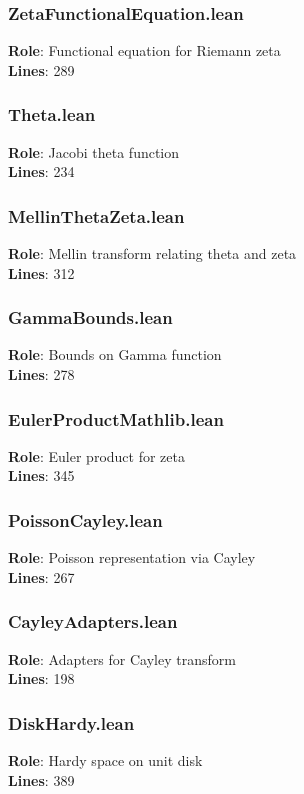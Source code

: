 \subsubsection{ZetaFunctionalEquation.lean}
\textbf{Role}: Functional equation for Riemann zeta\\
\textbf{Lines}: 289

\subsubsection{Theta.lean}
\textbf{Role}: Jacobi theta function\\
\textbf{Lines}: 234

\subsubsection{MellinThetaZeta.lean}
\textbf{Role}: Mellin transform relating theta and zeta\\
\textbf{Lines}: 312

\subsubsection{GammaBounds.lean}
\textbf{Role}: Bounds on Gamma function\\
\textbf{Lines}: 278

\subsubsection{EulerProductMathlib.lean}
\textbf{Role}: Euler product for zeta\\
\textbf{Lines}: 345

\subsubsection{PoissonCayley.lean}
\textbf{Role}: Poisson representation via Cayley\\
\textbf{Lines}: 267

\subsubsection{CayleyAdapters.lean}
\textbf{Role}: Adapters for Cayley transform\\
\textbf{Lines}: 198

\subsubsection{DiskHardy.lean}
\textbf{Role}: Hardy space on unit disk\\
\textbf{Lines}: 389

